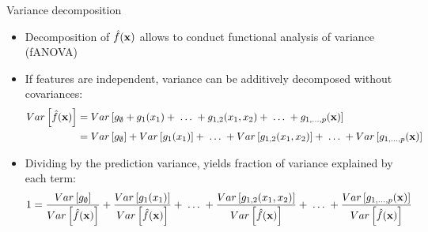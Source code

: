\documentclass[11pt,compress,t,notes=noshow, aspectratio=169, xcolor=table]{beamer}
\newcommand{\open}{}
\newcommand{\close}{}
\begin{document}
\begin{frame}{Variance decomposition}

\begin{itemize}
\item Decomposition of $\hat{f}(\xv)$ allows to conduct functional analysis of variance (fANOVA)
\item If features are independent, variance can be additively decomposed without covariances:
 \begin{align*}Var\left[\hat{f}(\xv)\right] &=  Var\left[g_{\open \emptyset \close} + g_{\open 1 \close}(x_1) + \;\dots\; + g_{\open 1, 2 \close}(x_1, x_2) + \;\dots\; + g_{\open 1,\ldots,p \close}(\xv) \right] \\
&= Var\left[g_{\open \emptyset \close}\right] + Var\left[g_{\open 1 \close}(x_1)\right] + \;\dots\; + Var\left[g_{\open 1, 2 \close}(x_1, x_2)\right] + \;\dots\; + Var\left[g_{\open 1,\ldots,p \close}(\xv)\right]\end{align*}


\item Dividing by the prediction variance, yields fraction of variance explained by each term:
\begin{align*}
1 &= \frac{Var\left[g_{\open \emptyset \close}\right]}{\predvar} + \frac{Var\left[g_{\open 1 \close}(x_1)\right]}{\predvar} + %
\;\dots\;
+ \frac{Var\left[g_{\open 1, 2 \close}(x_1, x_2)\right]}{\predvar} + \;\dots\; + \frac{Var\left[g_{\open 1,\ldots,p \close}(\xv)\right]}{\predvar}
\end{align*}


\end{itemize}
\end{frame}
\end{document}
